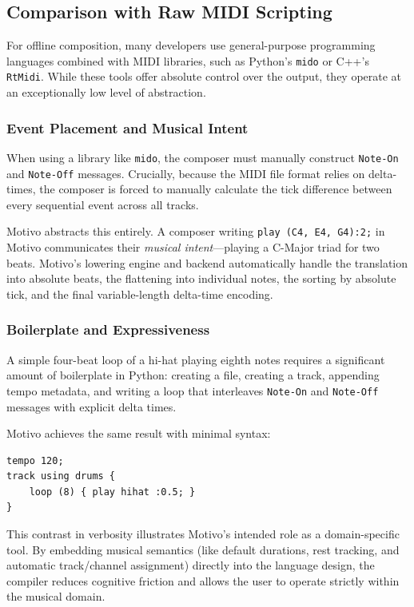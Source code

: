 \subsection{Comparison with Raw MIDI Scripting}\label{detail-subsec:comparison-with-raw-midi-scripting}

For offline composition, many developers use general-purpose programming languages combined with MIDI libraries, such as
Python's \texttt{mido} or C++'s \texttt{RtMidi}.
While these tools offer absolute control over the output, they operate at an exceptionally low level of abstraction.

\subsubsection{Event Placement and Musical Intent}
When using a library like \texttt{mido}, the composer must manually construct \texttt{Note-On} and \texttt{Note-Off}
messages.
Crucially, because the MIDI file format relies on delta-times, the composer is forced to manually calculate the tick
difference between every sequential event across all tracks.

Motivo abstracts this entirely.
A composer writing \texttt{play (C4, E4, G4):2;} in Motivo communicates their \textit{musical intent}---playing a
C-Major triad for two beats.
Motivo's lowering engine and backend automatically handle the translation into absolute beats, the flattening into
individual notes, the sorting by absolute tick, and the final variable-length delta-time encoding.

\subsubsection{Boilerplate and Expressiveness}
A simple four-beat loop of a hi-hat playing eighth notes requires a significant amount of boilerplate in
Python: creating
a file, creating a track, appending tempo metadata, and writing a loop that interleaves \texttt{Note-On} and
\texttt{Note-Off} messages with explicit delta times.

Motivo achieves the same result with minimal syntax:
\begin{lstlisting}[language=Motivo,label={lst:midi-scripting-comparison}]
tempo 120;
track using drums {
    loop (8) { play hihat :0.5; }
}
\end{lstlisting}

This contrast in verbosity illustrates Motivo's intended role as a domain-specific tool.
By embedding musical semantics (like default durations, rest tracking, and automatic track/channel
assignment) directly into
the language design, the compiler reduces cognitive friction and allows the user to operate strictly within the musical
domain.
